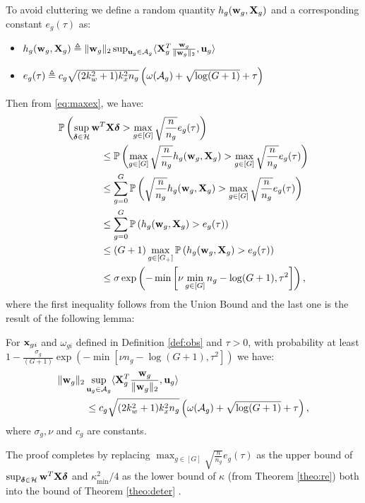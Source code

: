 To avoid cluttering we define a random quantity $h_g(\mathbf{w}_g, \mathbf{X}_g)$ and a corresponding constant $e_g(\tau)$ as: 
{\small\begin{itemize}
	\item $h_g(\w_g, \X_g) \triangleq   \norm{\w_g}{2}  \sup_{\u_g \in \cA_g} \langle \X_g^T \frac{\w_g}{\norm{\w_g}{2}}, \u_g \rangle $
	\item $e_g(\tau) \triangleq  c_g\sqrt{(2k_w^2 + 1)k_x^2n_g} \left(\omega(\cA_g) + \sqrt{\log (G+1)} + \tau \right)$
\end{itemize}}
Then from \eqref{eq:maxex}, we have:
\begin{align}
\nr  
&\pr \left(\sup_{\ddelta \in \cH} \w^T \X\ddelta >  \max_{g \in [G]} \sqrt{\frac{n}{n_g}} e_g(\tau) \right) 
\\ \nr 
&\hspace*{1.5cm}\leq \pr \left(\max_{g \in [G]} \sqrt{\frac{n}{n_g}} h_g(\w_g, \X_g) > \max_{g \in [G]} \sqrt{\frac{n}{n_g}} e_g(\tau) \right) 
\\  \nr 
&\hspace*{1.5cm}\leq \sum_{g=0}^{G} \pr \left(\sqrt{\frac{n}{n_g}} h_g(\w_g, \X_g) >  \max_{g \in [G]}  \sqrt{\frac{n}{n_g}} e_g(\tau) \right)  
\\ \nr 
&\hspace*{1.5cm}\leq \sum_{g=0}^{G} \pr \left( h_g(\w_g, \X_g) >  e_g(\tau) \right)  
\\ \nr 	
&\hspace*{1.5cm}\leq (G+1) \max_{g \in [G_+]} \pr \left(h_g(\w_g, \X_g) > e_g(\tau) \right) 
\\ \nr 
&\hspace*{1.5cm}\leq \sigma \exp\left(-\min\left[\nu  \min_{g \in [G]} n_g - \log (G+1), \tau^2\right]\right), 
\end{align} 
where the first inequality follows from the Union Bound and the last one is the result of the following lemma:
\begin{lemma}
	\label{lemm:mainlem}
	For $\mathbf{x}_{gi}$ and $\omega_{gi}$ defined in Definition \ref{def:obs} and $\tau > 0$, with probability at least $1 - \frac{\sigma_g}{(G+1)} \exp\left(-\min\left[\nu  n_g - \log (G+1), \tau^2\right]\right) $ we have:
	\begin{align}	
	&\norm{\w_g}{2} \sup_{\u_g \in \cA_g} \langle \X_g^T \frac{\w_g}{\norm{\w_g}{2}}, \u_g \rangle 
	\\ \nr 
	&\hspace*{1cm}\leq 	c_g \sqrt{(2k_w^2 + 1)k_x^2n_g}  \left(\omega(\cA_g)+\sqrt{\log (G+1)} + \tau \right), \nr
	\end{align}
	where $\sigma_g, \nu$ and $c_g$ are constants.
\end{lemma}	
The proof completes by replacing $\max_{g \in [G]} \sqrt{\frac{n}{n_g}} e_g(\tau)$ as the upper bound of $\sup_{\ddelta \in \cH} \w^T \X\ddelta$ and $\kappa^2_{\min}/4$ as the lower bound of $\kappa$ (from Theorem \ref{theo:re}) both into the bound of Theorem \ref{theo:deter} . \hfill {\qedsymbol}



